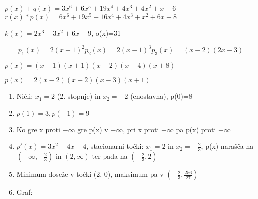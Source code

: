\begin{Odg}{2.1}
    $p(x)+q(x)=3x^6+6x^5+19x^4+4x^3+4x^2+x+6$
$r(x)*p(x)= 6x^6+19x^5+16x^4+4x^3+x^2+6x+8$
  
\end{Odg}
\begin{Odg}{2.2}
    $k(x)=2x^3-3x^2+6x-9$, o(x)=31
  
\end{Odg}
\begin{Odg}{2.3}
   \[
p_1(x)=2(x-1)^2
p_2(x)=2(x-1)^3
p_3(x)=(x-2)(2x-3)
\]
 
\end{Odg}
\begin{Odg}{2.4}
    $p(x)=(x-1)(x+1)(x-2)(x-4)(x+8)$
  
\end{Odg}
\begin{Odg}{2.5}
    $p(x)=2(x-2)(x+2)(x-3)(x+1)$
  
\end{Odg}
\begin{Odg}{2.6}
    \begin{enumerate}
\item Ničli: $x_1=2$ (2. stopnje) in $x_2=-2$ (enostavna), p(0)=8
\item $p(1)=3, p(-1)=9$
\item Ko gre x proti $-\infty$ gre p(x) v $-\infty$, pri x proti $+\infty$ pa p(x) proti $+\infty$
\item $p'(x)=3x^2-4x-4$, stacionarni točki: $x_1=2$ in $x_2=-\frac{2}{3}$, p(x) narašča na $(-\infty, -\frac{2}{3})$  in $(2, \infty)$ ter pada na $(-\frac{2}{3}, 2)$
\item Minimum doseže v točki (2, 0), maksimum pa v $(-\frac{2}{3}, \frac{256}{27})$
\item Graf:
\end{enumerate}
  
\end{Odg}
